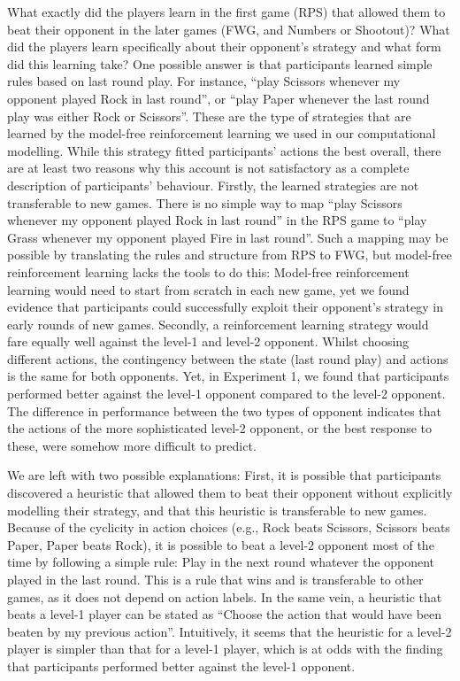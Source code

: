 \documentclass[smallextended]{svjour3}       %
\begin{document}
What exactly did the players learn in the first game (RPS) that allowed
them to beat their opponent in the later games (FWG, and Numbers or
Shootout)? What did the players learn specifically about their
opponent's strategy and what form did this learning take? One possible
answer is that participants learned simple rules based on last round
play. For instance, ``play Scissors whenever my opponent played Rock in
last round'', or ``play Paper whenever the last round play was either
Rock or Scissors''. These are the type of strategies that are learned by
the model-free reinforcement learning we used in our computational
modelling. While this strategy fitted participants' actions the best
overall, there are at least two reasons why this account is not
satisfactory as a complete description of participants' behaviour.
Firstly, the learned strategies are not transferable to new games. There
is no simple way to map ``play Scissors whenever my opponent played Rock
in last round'' in the RPS game to ``play Grass whenever my opponent
played Fire in last round''. Such a mapping may be possible by
translating the rules and structure from RPS to FWG, but model-free
reinforcement learning lacks the tools to do this: Model-free
reinforcement learning would need to start from scratch in each new
game, yet we found evidence that participants could successfully exploit
their opponent's strategy in early rounds of new games. Secondly, a
reinforcement learning strategy would fare equally well against the
level-1 and level-2 opponent. Whilst choosing different actions, the
contingency between the state (last round play) and actions is the same
for both opponents. Yet, in Experiment 1, we found that participants
performed better against the level-1 opponent compared to the level-2
opponent. The difference in performance between the two types of
opponent indicates that the actions of the more sophisticated level-2
opponent, or the best response to these, were somehow more difficult to
predict.

We are left with two possible explanations: First, it is possible that
participants discovered a heuristic that allowed them to beat their
opponent without explicitly modelling their strategy, and that this
heuristic is transferable to new games. Because of the cyclicity in
action choices (e.g., Rock beats Scissors, Scissors beats Paper, Paper
beats Rock), it is possible to beat a level-2 opponent most of the time
by following a simple rule: Play in the next round whatever the opponent
played in the last round. This is a rule that wins and is transferable
to other games, as it does not depend on action labels. In the same
vein, a heuristic that beats a level-1 player can be stated as ``Choose
the action that would have been beaten by my previous action''.
Intuitively, it seems that the heuristic for a level-2 player is simpler
than that for a level-1 player, which is at odds with the finding that
participants performed better against the level-1 opponent.
\end{document}
